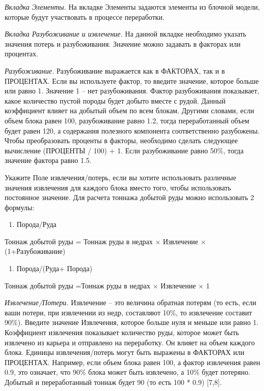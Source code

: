 \emph{Вкладка Элементы.} На вкладке Элементы задаются элементы из
блочной модели, которые будут участвовать в процессе переработки.

\emph{Вкладка Разубоживание и извлечение.} На данной вкладке необходимо
указать значения потерь и разубоживания. Значение можно задавать в
факторах или процентах.

\emph{Разубоживание.} Разубоживание выражается как в ФАКТОРАХ, так и в
ПРОЦЕНТАХ. Если вы используете фактор, то введите значение, которое
больше или равно 1. Значение 1 -- нет разубоживания. Фактор
разубоживания показывает, какое количество пустой породы будет добыто
вместе с рудой. Данный коэффициент влияет на добытый объем по всем
блокам. Другими словами, если объем блока равен 100, разубоживание равно
1.2, тогда переработанный объем будет равен 120, а содержания полезного
компонента соответственно разубожены. Чтобы преобразовать проценты в
факторы, необходимо сделать следующее вычисление (ПРОЦЕНТЫ / 100) + 1.
Если разубоживание равно 50\%, тогда значение фактора равно 1.5.

Укажите Поле извлечения/потерь, если вы хотите использовать различные
значения извлечения для каждого блока вместо того, чтобы использовать
постоянное значение. Для расчета тоннажа добытой руды можно использовать
2 формулы:

\begin{enumerate}
\def\labelenumi{\arabic{enumi}.}
\item
  Порода/Руда
\end{enumerate}

Тоннаж добытой руды = Тоннаж руды в недрах × Извлечение ×
(1+Разубоживание)

\begin{enumerate}
\def\labelenumi{\arabic{enumi}.}
\setcounter{enumi}{1}
\item
  Порода/(Руда+ Порода)
\end{enumerate}

Тоннаж добытой руды =Тоннаж руды в недрах × Извлечение × 1

\emph{Извлечение/Потери.} Извлечение -- это величина обратная потерям
(то есть, если ваши потери, при извлечении из недр, составляют 10\%, то
извлечение составит 90\%). Введите значение Извлечения, которое больше
нуля и меньше или равно 1. Коэффициент извлечения показывает количество
руды, которое может быть извлечено из карьера и отправлено на
переработку. Он влияет на объем каждого блока. Единицы извлечения/потерь
могут быть выражены в ФАКТОРАХ или ПРОЦЕНТАХ. Например, если объем блока
равен 100, а фактор извлечения равен 0.9, это означает, что 90\% блока
может быть извлечено, а 10\% будет потеряно. Добытый и переработанный
тоннаж будет 90 (то есть 100 * 0.9) {[}7,8{]}.

